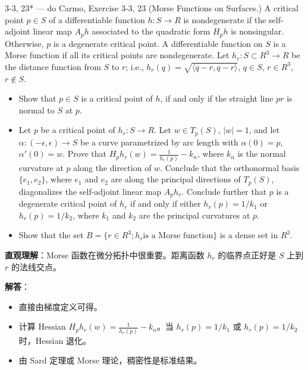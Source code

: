 \begin{exercise}{3-3, 23* — do Carmo, Exercise 3-3, 23}
(Morse Functions on Surfaces.) A critical point $p \in S$ of a differentiable function $h \colon S \to R$ is nondegenerate if the self-adjoint linear map $A_{p}h$ associated to the quadratic form $H_{p}h$ is nonsingular. Otherwise, $p$ is a degenerate critical point. A differentiable function on $S$ is a Morse function if all its critical points are nondegenerate. Let $h_{r} \colon S \subset R^{3} \to R$ be the distance function from $S$ to $r$; i.e., $h _ {r} (q) = \sqrt {\langle q - r , q - r \rangle}$, $q \in S$, $r \in R ^ {3}$, $r \notin S$.
\begin{itemize}
\item[a.] Show that $p \in S$ is a critical point of $h$, if and only if the straight line $pr$ is normal to $S$ at $p$.
\item[b.] Let $p$ be a critical point of $h_r \colon S \to R$. Let $w \in T_p(S)$, $|w| = 1$, and let $\alpha \colon (-\epsilon, \epsilon) \to S$ be a curve parametrized by arc length with $\alpha(0) = p$, $\alpha'(0) = w$. Prove that $H _ {p} h _ {r} (w) = \frac {1}{h _ {r} (p)} - k _ {n}$, where $k_{n}$ is the normal curvature at $p$ along the direction of $w$. Conclude that the orthonormal basis $\{e_1, e_2\}$, where $e_1$ and $e_2$ are along the principal directions of $T_p(S)$, diagonalizes the self-adjoint linear map $A_{p}h_{r}$. Conclude further that $p$ is a degenerate critical point of $h_r$ if and only if either $h_r(p) = 1 / k_1$ or $h_r(p) = 1 / k_2$, where $k_{1}$ and $k_{2}$ are the principal curvatures at $p$.
\item[c.] Show that the set $B = \{r \in R ^ {3}; h _ {r} \text {is a Morse function}\}$ is a dense set in $R^3$.
\end{itemize}
\end{exercise}

\begin{solution}
\textbf{直观理解}：Morse 函数在微分拓扑中很重要。距离函数 $h_r$ 的临界点正好是 $S$ 上到 $r$ 的法线交点。

\textbf{解答}：
\begin{itemize}
\item[a.] 直接由梯度定义可得。
\item[b.] 计算 Hessian $H_p h_r(w) = \frac{1}{h_r(p)} - k_n$。当 $h_r(p) = 1/k_1$ 或 $h_r(p) = 1/k_2$ 时，Hessian 退化。
\item[c.] 由 Sard 定理或 Morse 理论，稠密性是标准结果。
\end{itemize}
\end{solution}

